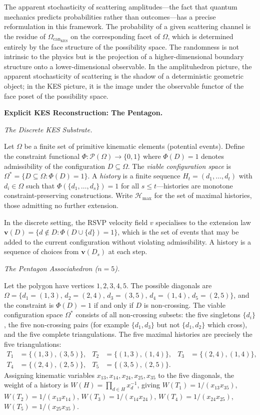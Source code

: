 \documentclass[11pt]{article}
\theoremstyle{plain}
\theoremstyle{definition}
\theoremstyle{remark}
\newcommand{\Phif}{\Phi}
\newcommand{\vf}{v}
\newcommand{\OmKS}{\Omega}
\newcommand{\CF}{\Omega_{\mathrm{can}}}
\newcommand{\Hmax}{\mathcal{H}_{\max}}
\begin{document}
The apparent stochasticity of scattering amplitudes---the fact that quantum mechanics predicts probabilities rather than outcomes---has a precise reformulation in this framework. The probability of a given scattering channel is the residue of $\CF_{\mathrm{KES}}$ on the corresponding facet of $\OmKS$, which is determined entirely by the face structure of the possibility space. The randomness is not intrinsic to the physics but is the projection of a higher-dimensional boundary structure onto a lower-dimensional observable. In the amplituhedron picture, the apparent stochasticity of scattering is the shadow of a deterministic geometric object; in the KES picture, it is the image under the observable functor of the face poset of the possibility space.

\bigskip\noindent\textbf{Explicit KES Reconstruction: The Pentagon.}
\label{sec:discrete}

\medskip\noindent\textit{The Discrete KES Substrate.}

Let $\OmKS$ be a finite set of primitive kinematic elements (potential events). Define the constraint functional $\Phif: \mathcal{P}(\OmKS) \to \{0,1\}$ where $\Phif(D) = 1$ denotes admissibility of the configuration $D \subseteq \OmKS$. The \emph{viable configuration space} is $\OmKS^* = \{D \subseteq \OmKS : \Phif(D) = 1\}$. A \emph{history} is a finite sequence $H_t = (d_1, \ldots, d_t)$ with $d_i \in \OmKS$ such that $\Phif(\{d_1, \ldots, d_s\}) = 1$ for all $s \leq t$---histories are monotone constraint-preserving constructions. Write $\Hmax$ for the set of maximal histories, those admitting no further extension.

In the discrete setting, the RSVP velocity field $\vf$ specialises to the extension law $\mathbf{v}(D) = \{d \notin D : \Phif(D \cup \{d\}) = 1\}$, which is the set of events that may be added to the current configuration without violating admissibility. A history is a sequence of choices from $\mathbf{v}(D_s)$ at each step.

\medskip\noindent\textit{The Pentagon Associahedron ($n = 5$).}

Let the polygon have vertices $1, 2, 3, 4, 5$. The possible diagonals are $\OmKS = \{d_1 = (1,3),\, d_2 = (2,4),\, d_3 = (3,5),\, d_4 = (1,4),\, d_5 = (2,5)\}$, and the constraint is $\Phif(D) = 1$ if and only if $D$ is non-crossing. The viable configuration space $\OmKS^*$ consists of all non-crossing subsets: the five singletons $\{d_i\}$, the five non-crossing pairs (for example $\{d_1, d_3\}$ but not $\{d_1, d_2\}$ which cross), and the five complete triangulations. The five maximal histories are precisely the five triangulations:
\begin{align*}
  T_1 &= \{(1,3),(3,5)\}, & T_2 &= \{(1,3),(1,4)\}, & T_3 &= \{(2,4),(1,4)\},\\
  T_4 &= \{(2,4),(2,5)\}, & T_5 &= \{(3,5),(2,5)\}.
\end{align*}
Assigning kinematic variables $x_{13}, x_{14}, x_{24}, x_{25}, x_{35}$ to the five diagonals, the weight of a history is $W(H) = \prod_{d \in H} x_d^{-1}$, giving $W(T_1) = 1/(x_{13}x_{35})$, $W(T_2) = 1/(x_{13}x_{14})$, $W(T_3) = 1/(x_{14}x_{24})$, $W(T_4) = 1/(x_{24}x_{25})$, $W(T_5) = 1/(x_{25}x_{35})$.
\end{document}
